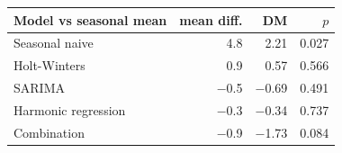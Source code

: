 \begin{tabular}{|l|r|r|r|}
\hline
\textbf{Model vs seasonal mean} & \textbf{mean diff.} & \textbf{DM} & \textbf{$p$} \\\hline
Seasonal naive & 4.8 & 2.21 & 0.027 \\\hline
Holt-Winters & 0.9 & 0.57 & 0.566 \\\hline
SARIMA & \ensuremath{-}0.5 & \ensuremath{-}0.69 & 0.491 \\\hline
Harmonic regression & \ensuremath{-}0.3 & \ensuremath{-}0.34 & 0.737 \\\hline
Combination & \ensuremath{-}0.9 & \ensuremath{-}1.73 & 0.084 \\\hline
\end{tabular}
